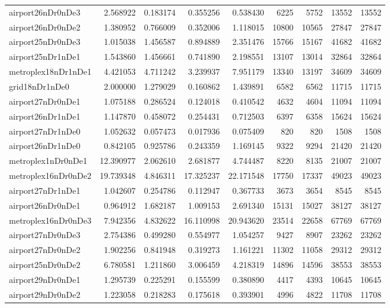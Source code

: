 \begin{longtable}{|l|r|r|r|r|r|r|r|r|}
airport26nDr0nDe3 & 2.568922 & 0.183174 & 0.355256 & 0.538430 & 6225 & 5752 & 13552 & 13552 \\
airport26nDr0nDe2 & 1.380952 & 0.766009 & 0.352006 & 1.118015 & 10800 & 10565 & 27847 & 27847 \\
airport25nDr0nDe3 & 1.015038 & 1.456587 & 0.894889 & 2.351476 & 15766 & 15167 & 41682 & 41682 \\
airport25nDr1nDe1 & 1.543860 & 1.456661 & 0.741890 & 2.198551 & 13107 & 13014 & 32864 & 32864 \\
metroplex18nDr1nDe1 & 4.421053 & 4.711242 & 3.239937 & 7.951179 & 13340 & 13197 & 34609 & 34609 \\
grid18nDr1nDe0 & 2.000000 & 1.279029 & 0.160862 & 1.439891 & 6582 & 6562 & 11715 & 11715 \\
airport27nDr0nDe1 & 1.075188 & 0.286524 & 0.124018 & 0.410542 & 4632 & 4604 & 11094 & 11094 \\
airport26nDr1nDe1 & 1.147870 & 0.458072 & 0.254431 & 0.712503 & 6397 & 6358 & 15624 & 15624 \\
airport27nDr1nDe0 & 1.052632 & 0.057473 & 0.017936 & 0.075409 & 820 & 820 & 1508 & 1508 \\
airport26nDr1nDe0 & 0.842105 & 0.925786 & 0.243359 & 1.169145 & 9322 & 9294 & 21420 & 21420 \\
metroplex1nDr0nDe1 & 12.390977 & 2.062610 & 2.681877 & 4.744487 & 8220 & 8135 & 21007 & 21007 \\
metroplex16nDr0nDe2 & 19.739348 & 4.846311 & 17.325237 & 22.171548 & 17750 & 17337 & 49023 & 49023 \\
airport27nDr1nDe1 & 1.042607 & 0.254786 & 0.112947 & 0.367733 & 3673 & 3654 & 8545 & 8545 \\
airport26nDr0nDe1 & 0.964912 & 1.682187 & 1.009153 & 2.691340 & 15131 & 15027 & 38127 & 38127 \\
metroplex16nDr0nDe3 & 7.942356 & 4.832622 & 16.110998 & 20.943620 & 23514 & 22658 & 67769 & 67769 \\
airport27nDr0nDe3 & 2.754386 & 0.499280 & 0.554977 & 1.054257 & 9427 & 8907 & 23262 & 23262 \\
airport27nDr0nDe2 & 1.902256 & 0.841948 & 0.319273 & 1.161221 & 11302 & 11058 & 29312 & 29312 \\
airport25nDr0nDe2 & 6.780581 & 1.211860 & 3.006459 & 4.218319 & 14896 & 14596 & 38553 & 38553 \\
airport29nDr0nDe1 & 1.295739 & 0.225291 & 0.155599 & 0.380890 & 4417 & 4393 & 10645 & 10645 \\
airport29nDr0nDe2 & 1.223058 & 0.218283 & 0.175618 & 0.393901 & 4996 & 4822 & 11708 & 11708 \\

\end{longtable}
